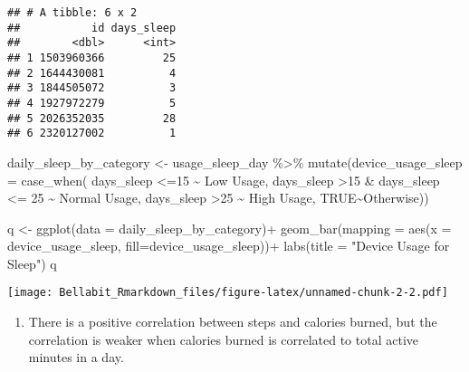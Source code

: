 \documentclass[
]{article}
\newenvironment{Shaded}{\begin{snugshade}}{\end{snugshade}}
\newcommand{\AttributeTok}[1]{\textcolor[rgb]{0.77,0.63,0.00}{#1}}
\newcommand{\ConstantTok}[1]{\textcolor[rgb]{0.00,0.00,0.00}{#1}}
\newcommand{\DecValTok}[1]{\textcolor[rgb]{0.00,0.00,0.81}{#1}}
\newcommand{\FunctionTok}[1]{\textcolor[rgb]{0.00,0.00,0.00}{#1}}
\newcommand{\NormalTok}[1]{#1}
\newcommand{\OtherTok}[1]{\textcolor[rgb]{0.56,0.35,0.01}{#1}}
\newcommand{\SpecialCharTok}[1]{\textcolor[rgb]{0.00,0.00,0.00}{#1}}
\newcommand{\StringTok}[1]{\textcolor[rgb]{0.31,0.60,0.02}{#1}}
\providecommand{\tightlist}{%
  \setlength{\itemsep}{0pt}\setlength{\parskip}{0pt}}
\begin{document}
\begin{verbatim}
## # A tibble: 6 x 2
##           id days_sleep
##        <dbl>      <int>
## 1 1503960366         25
## 2 1644430081          4
## 3 1844505072          3
## 4 1927972279          5
## 5 2026352035         28
## 6 2320127002          1
\end{verbatim}

\begin{Shaded}
\begin{Highlighting}[]
\NormalTok{daily\_sleep\_by\_category }\OtherTok{\textless{}{-}}\NormalTok{ usage\_sleep\_day }\SpecialCharTok{\%\textgreater{}\%}
  \FunctionTok{mutate}\NormalTok{(}\AttributeTok{device\_usage\_sleep =} \FunctionTok{case\_when}\NormalTok{(}
\NormalTok{    days\_sleep }\SpecialCharTok{\textless{}=}\DecValTok{15} \SpecialCharTok{\textasciitilde{}} \StringTok{\textquotesingle{}Low Usage\textquotesingle{}}\NormalTok{,}
\NormalTok{    days\_sleep }\SpecialCharTok{\textgreater{}}\DecValTok{15} \SpecialCharTok{\&}\NormalTok{ days\_sleep }\SpecialCharTok{\textless{}=} \DecValTok{25} \SpecialCharTok{\textasciitilde{}} \StringTok{\textquotesingle{}Normal Usage\textquotesingle{}}\NormalTok{,}
\NormalTok{    days\_sleep }\SpecialCharTok{\textgreater{}}\DecValTok{25} \SpecialCharTok{\textasciitilde{}} \StringTok{\textquotesingle{}High Usage\textquotesingle{}}\NormalTok{,}
    \ConstantTok{TRUE}\SpecialCharTok{\textasciitilde{}}\StringTok{\textquotesingle{}Otherwise\textquotesingle{}}\NormalTok{))}

\NormalTok{q }\OtherTok{\textless{}{-}} \FunctionTok{ggplot}\NormalTok{(}\AttributeTok{data =}\NormalTok{ daily\_sleep\_by\_category)}\SpecialCharTok{+}
  \FunctionTok{geom\_bar}\NormalTok{(}\AttributeTok{mapping =} \FunctionTok{aes}\NormalTok{(}\AttributeTok{x =}\NormalTok{ device\_usage\_sleep, }\AttributeTok{fill=}\NormalTok{device\_usage\_sleep))}\SpecialCharTok{+}
  \FunctionTok{labs}\NormalTok{(}\AttributeTok{title =} \StringTok{"Device Usage for Sleep"}\NormalTok{)}
\NormalTok{q}
\end{Highlighting}
\end{Shaded}

\texttt{[image: Bellabit\_Rmarkdown\_files/figure-latex/unnamed-chunk-2-2.pdf]}

\begin{enumerate}
\def\labelenumi{\arabic{enumi}.}
\setcounter{enumi}{2}
\tightlist
\item
  There is a positive correlation between steps and calories burned, but
  the correlation is weaker when calories burned is correlated to total
  active minutes in a day.
\end{enumerate}
\end{document}
